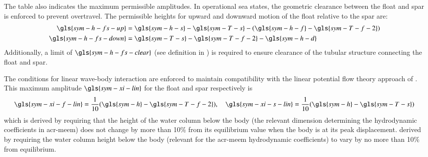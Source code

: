 The table also indicates the maximum permissible amplitudes.
In operational sea states, the geometric clearance between the float and spar is enforced to prevent overtravel.
The permissible heights for upward and downward motion of the float relative to the spar are:
\begin{equation}\label{eq:h-fs-up-down}
\begin{aligned}
    \gls{sym-h-fs-up} &= \gls{sym-h-s} - \gls{sym-T-s} - (\gls{sym-h-f}- \gls{sym-T-f-2}) \\
    \gls{sym-h-fs-down} &= \gls{sym-T-s} - \gls{sym-T-f-2} - \gls{sym-h-d}
\end{aligned}
\end{equation}
Additionally, a limit of $\gls{sym-h-fs-clear}$ (see definition in ) is required to ensure clearance of the tubular structure connecting the float and spar.

The conditions for linear wave-body interaction are enforced to maintain compatibility with the linear potential flow theory approach of .
This maximum amplitude $\gls{sym-xi-lin}$ for the float and spar respectively is
\begin{equation}
    \gls{sym-xi-f-lin} = \frac{1}{10} (\gls{sym-h}-\gls{sym-T-f-2}), \quad
    \gls{sym-xi-s-lin}  = \frac{1}{10} (\gls{sym-h}-\gls{sym-T-s})
\end{equation}
\ifdefined\DISSERTATION
    which is derived by requiring that the height of the water column below the body (the relevant dimension determining the hydrodynamic coefficients in \gls{acr-meem}) does not change by more than 10\% from its equilibrium value when the body is at its peak displacement.
\else
    derived by requiring the water column height below the body (relevant for the \gls{acr-meem} hydrodynamic coefficients) to vary by no more than 10\% from equilibrium.
\fi

